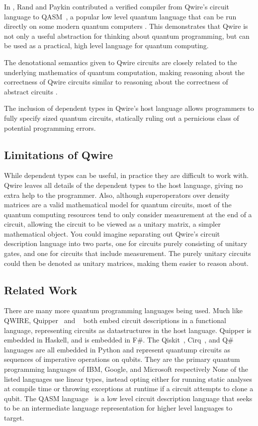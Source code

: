 In \citet{qwirepractice}, Rand and Paykin contributed a verified compiler from Qwire's circuit language to QASM~\cite{qasm}, a popular low level quantum language that can be run directly on some modern quantum computers .
This demonstrates that Qwire is not only a useful abstraction for thinking about quantum programming, but can be used as a practical, high level language for quantum computing.

The denotational semantics given to Qwire circuits are closely related to the underlying mathematics of quantum computation, making reasoning about the correctness of Qwire circuits similar to reasoning about the correctness of abstract circuits .

The inclusion of dependent types in Qwire's host language allows programmers to fully specify sized quantum circuits, statically ruling out a pernicious class of potential programming errors.

\subsection{Limitations of Qwire}

While dependent types can be useful, in practice they are difficult to work with.
Qwire leaves all details of the dependent types to the host language, giving no extra help to the programmer.
Also, although superoperators over density matrices are a valid mathematical model for quantum circuits, most of the quantum computing resources tend to only consider measurement at the end of a circuit, allowing the circuit to be viewed as a unitary matrix, a simpler mathematical object.
You could imagine separating out Qwire's circuit description language into two parts, one for circuits purely consisting of unitary gates, and one for circuits that include measurement.
The purely unitary circuits could then be denoted as unitary matrices, making them easier to reason about.

\subsection{Related Work}

There are many more quantum programming languages being used. 
Much like QWIRE, Quipper~\cite{quipper} and \liquid~\cite{liquid} both embed circuit descriptions in a functional language, representing circuits as datastructures in the host language.
Quipper is embedded in Haskell, and \liquid is embedded in F\#.
The Qiskit~\cite{qiskit}, Cirq~\cite{cirq}, and Q\#~\cite{qsharp} languages are all embedded in Python and represent quantump circuits as sequences of imperative operations on qubits.
They are the primary quantum programming languages of IBM, Google, and Microsoft respectively
None of the listed languages use linear types, instead opting either for running static analyses at compile time or throwing exceptions at runtime if a circuit attempts to clone a qubit.
The QASM language~\cite{qasm} is a low level circuit description language that seeks to be an intermediate language representation for higher level languages to target.

